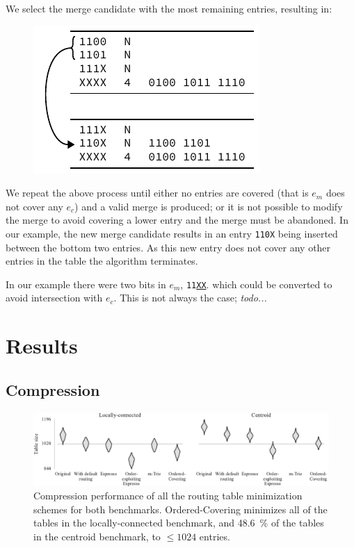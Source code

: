 \documentclass[conference]{IEEEtran}
\newcommand{\mytt}[1]{\texttt{\footnotesize#1}}
\begin{document}
  We select the merge candidate with the most remaining entries, resulting in:\par\nopagebreak
  \begin{figure}[H]
    \centering
    \includegraphics{figures/downcheck_resolve_example_2}
  \end{figure}
  
  We repeat the above process until either no entries are covered (that is $e_m$ does not cover any $e_c$) and a valid merge is produced; or it is not possible to modify the merge to avoid covering a lower entry and the merge must be abandoned.
  In our example, the new merge candidate results in an entry \mytt{110X} being inserted between the bottom two entries.
  As this new entry does not cover any other entries in the table the algorithm terminates.
  
  In our example there were two bits in $e_m$, \mytt{11\underline{XX}}. which could be converted to avoid intersection with $e_c$.
  This is not always the case; \textit{todo...}

  \section{Results}

  \subsection{Compression}

\begin{figure}
  \centering
  \includegraphics{experiments/results_esp_and_oc}
  \caption{Compression performance of all the routing table minimization schemes for both benchmarks.
           Ordered-Covering minimizes all of the tables in the locally-connected benchmark, and
           \SI{48.6}{\percent} of the tables in the centroid benchmark, to $\le 1024$ entries.
           }
  \label{fig:results/final}
\end{figure}
\end{document}
